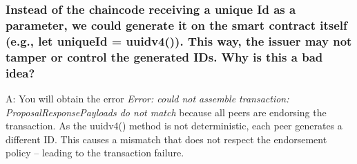 \documentclass[12pt,a4paper]{article}
\begin{document}
\subsubsection*{Instead of the chaincode receiving a unique Id as a parameter, we could generate it on the smart contract itself (e.g., let uniqueId = uuidv4()). This way, the issuer may not tamper or control the generated IDs. Why is this a bad idea?}

A: You will obtain the error \emph{Error: could not assemble transaction: ProposalResponsePayloads do not match} because all peers are endorsing the transaction. As the uuidv4() method is not deterministic, each peer generates a different ID. This causes a mismatch that does not respect the endorsement policy -- leading to the transaction failure.



\end{document}
